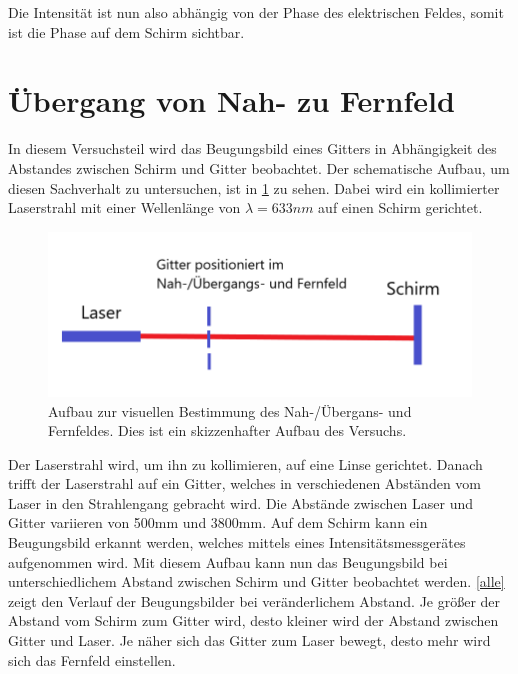 Die Intensität ist nun also abhängig von der Phase des elektrischen Feldes, somit ist die Phase auf dem Schirm sichtbar.

\section{Übergang von Nah- zu Fernfeld}
In diesem Versuchsteil wird das Beugungsbild eines Gitters in Abhängigkeit des Abstandes zwischen Schirm und Gitter beobachtet. Der schematische Aufbau, um diesen Sachverhalt zu untersuchen, ist in \cref{Lana1} zu sehen.
Dabei wird ein kollimierter Laserstrahl mit einer Wellenlänge von $\lambda = 633 nm$ auf einen Schirm gerichtet. 
\begin{figure}[h!]
	\centering
	\includegraphics[scale = 0.65]{Lana-Bild1.png}
	\caption{Aufbau zur visuellen Bestimmung des Nah-/Übergans- und Fernfeldes. Dies ist ein skizzenhafter Aufbau des Versuchs.}
	\label{Lana1}
\end{figure}
Der Laserstrahl wird, um ihn zu kollimieren, auf eine Linse gerichtet.
Danach trifft der Laserstrahl auf ein Gitter, welches in verschiedenen Abständen vom Laser in den Strahlengang gebracht wird. Die Abstände zwischen Laser und Gitter variieren von 500mm und 3800mm. Auf dem Schirm kann ein Beugungsbild erkannt werden, welches mittels eines Intensitätsmessgerätes aufgenommen wird.
Mit diesem Aufbau kann nun das Beugungsbild bei unterschiedlichem Abstand zwischen Schirm und Gitter beobachtet werden. \cref{alle} zeigt den Verlauf der Beugungsbilder bei veränderlichem Abstand. Je größer der Abstand vom Schirm zum Gitter wird, desto kleiner wird der Abstand zwischen Gitter und Laser. Je näher sich das Gitter zum Laser bewegt, desto mehr wird sich das Fernfeld einstellen.
